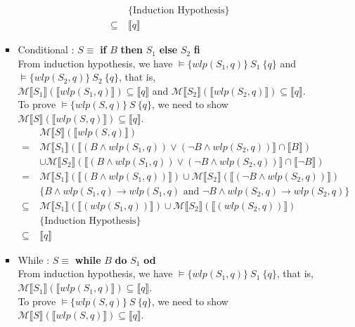 \documentclass[11pt]{article}
\begin{document}
\begin{enumerate}
\begin{enumerate}
\begin{itemize}
\begin{align*}
						&\{\text{Induction Hypothesis}\}\\
						\subseteq~ & \llbracket q \rrbracket
					\end{align*}
				\item Conditional : $S\equiv$ \textbf{if} $B$ \textbf{then} $S_{1}$ \textbf{else} $S_{2}$ \textbf{fi}\\
					From induction hypothesis, we have $\models \{wlp(S_{1}, q)\}~S_{1}~\{q\}$ and $\models \{wlp(S_{2}, q)\}~S_{2}~\{q\}$, that is,\\ $\mathcal{M}\llbracket S_{1} \rrbracket (\llbracket wlp(S_{1}, q) \rrbracket) \subseteq \llbracket q \rrbracket$ and $\mathcal{M}\llbracket S_{2} \rrbracket (\llbracket wlp(S_{2}, q) \rrbracket) \subseteq \llbracket q \rrbracket$.\\ To prove $\models \{wlp(S,q)\}~S~\{q\}$, we need to show $\mathcal{M}\llbracket S\rrbracket(\llbracket wlp(S, q)\rrbracket) \subseteq \llbracket q \rrbracket$.
					\begin{align*}
						&\mathcal{M}\llbracket S\rrbracket(\llbracket wlp(S, q)\rrbracket)\\
						=~ & \mathcal{M}\llbracket S_{1}\rrbracket(\llbracket (B \land wlp(S_{1}, q)) \lor (\neg B \land wlp(S_{2}, q))\rrbracket \cap \llbracket B \rrbracket)\\
						& \cup \mathcal{M}\llbracket S_{2}\rrbracket(\llbracket (B \land wlp(S_{1}, q)) \lor (\neg B \land wlp(S_{2}, q))\rrbracket \cap \llbracket \neg B \rrbracket)\\
						=~ & \mathcal{M}\llbracket S_{1}\rrbracket(\llbracket (B \land wlp(S_{1}, q)) \rrbracket) \cup \mathcal{M}\llbracket S_{2}\rrbracket(\llbracket (\neg B \land wlp(S_{2}, q)) \rrbracket)\\
						&\{B \land wlp(S_{1}, q) \to wlp(S_{1}, q) \text{ and } \neg B \land wlp(S_{2}, q) \to wlp(S_{2}, q)\}\\
						\subseteq~ & \mathcal{M}\llbracket S_{1}\rrbracket(\llbracket (wlp(S_{1}, q)) \rrbracket) \cup \mathcal{M}\llbracket S_{2}\rrbracket(\llbracket (wlp(S_{2}, q)) \rrbracket)\\
						&\{\text{Induction Hypothesis}\}\\
						\subseteq~ & \llbracket q \rrbracket
					\end{align*}
				\item While : $S\equiv$ \textbf{while} $B$ \textbf{do} $S_{1}$ \textbf{od}\\
					From induction hypothesis, we have $\models \{wlp(S_{1}, q)\}~S_{1}~\{q\}$, that is, $\mathcal{M}\llbracket S_{1} \rrbracket (\llbracket wlp(S_{1}, q) \rrbracket) \subseteq \llbracket q \rrbracket$.\\ To prove $\models \{wlp(S,q)\}~S~\{q\}$, we need to show $\mathcal{M}\llbracket S\rrbracket(\llbracket wlp(S, q)\rrbracket) \subseteq \llbracket q \rrbracket$.
			\end{itemize}
		\end{enumerate}


\end{enumerate}
\end{document}
